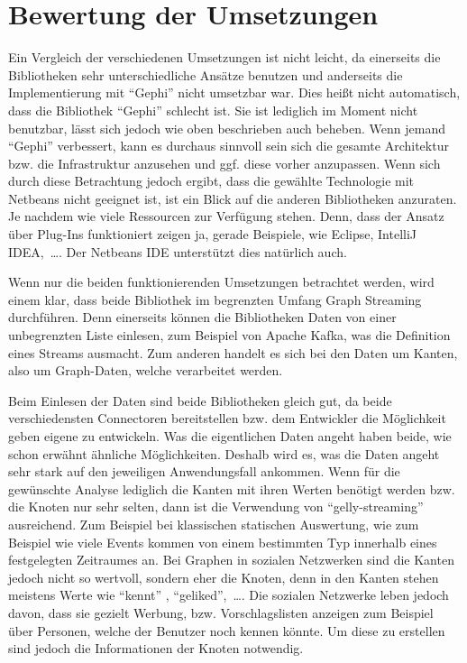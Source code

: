 \section{Bewertung der Umsetzungen}
Ein Vergleich der verschiedenen Umsetzungen ist nicht leicht, da einerseits die
Bibliotheken sehr unterschiedliche Ansätze benutzen und anderseits die
Implementierung mit \enquote{Gephi} nicht umsetzbar war. Dies heißt nicht
automatisch, dass die Bibliothek \enquote{Gephi} schlecht ist. Sie ist lediglich
im Moment nicht benutzbar, lässt sich jedoch wie oben beschrieben auch beheben.
Wenn jemand \enquote{Gephi} verbessert, kann es durchaus sinnvoll sein sich die
gesamte Architektur bzw. die Infrastruktur anzusehen und ggf. diese vorher
anzupassen. Wenn sich durch diese Betrachtung jedoch ergibt, dass die gewählte
Technologie mit Netbeans nicht geeignet ist, ist ein Blick auf die
anderen Bibliotheken anzuraten. Je nachdem wie viele Ressourcen zur
Verfügung stehen. Denn, dass der Ansatz über Plug-Ins funktioniert zeigen ja,
gerade Beispiele, wie Eclipse, IntelliJ IDEA,~\dots . Der Netbeans \gls{IDE}
unterstützt dies natürlich auch.

Wenn nur die beiden funktionierenden Umsetzungen betrachtet werden, wird einem
klar, dass beide Bibliothek im begrenzten Umfang Graph Streaming durchführen.
Denn einerseits können die Bibliotheken Daten von einer unbegrenzten Liste
einlesen, zum Beispiel von Apache Kafka, was die Definition eines Streams
ausmacht. Zum anderen handelt es sich bei den Daten um Kanten, also um
Graph-Daten, welche verarbeitet werden.

Beim Einlesen der Daten sind beide Bibliotheken gleich gut, da beide
verschiedensten Connectoren bereitstellen bzw. dem Entwickler die Möglichkeit
geben eigene zu entwickeln. Was die eigentlichen Daten angeht haben beide, wie
schon erwähnt ähnliche Möglichkeiten. Deshalb wird es, was die Daten angeht sehr
stark auf den jeweiligen Anwendungsfall ankommen. Wenn für die gewünschte Analyse
lediglich die Kanten mit ihren Werten benötigt werden bzw. die Knoten nur sehr
selten, dann ist die Verwendung von \enquote{gelly-streaming} ausreichend. Zum
Beispiel bei klassischen statischen Auswertung, wie zum Beispiel wie viele Events
kommen von einem bestimmten Typ innerhalb eines festgelegten Zeitraumes an. Bei
Graphen in sozialen Netzwerken sind die Kanten jedoch nicht so wertvoll, sondern
eher die Knoten, denn in den Kanten stehen meistens Werte wie \enquote{kennt}
, \enquote{geliked},~\dots . Die sozialen Netzwerke leben jedoch davon, dass sie
gezielt Werbung, bzw. Vorschlagslisten anzeigen zum Beispiel über Personen,
welche der Benutzer noch kennen könnte. Um diese zu erstellen sind jedoch die
Informationen der Knoten notwendig.

